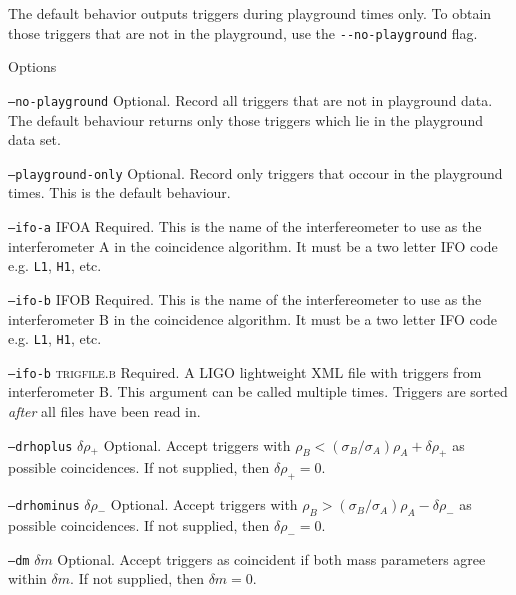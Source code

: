 \begin{entry}
The default behavior outputs triggers during playground times only. To obtain
those triggers that are not in the playground, use the \verb$--no-playground$
flag.     

\item[Options]\leavevmode
\begin{entry}
\item[\texttt{--no-playground}] Optional.  Record all triggers that are
not in playground data.  The default behaviour returns only those triggers
which lie in the playground data set.  

\item[\texttt{--playground-only}] Optional.  Record only triggers that
occour in the playground times.  This is the default behaviour.

\item[\texttt{--ifo-a} \textsc{IFOA}] Required. This is the name of the
interfereometer to use as the interferometer A in the coincidence algorithm.
It must be a two letter IFO code e.g. \texttt{L1}, \texttt{H1}, etc.

\item[\texttt{--ifo-b} \textsc{IFOB}] Required. This is the name of the
interfereometer to use as the interferometer B in the coincidence algorithm.
It must be a two letter IFO code e.g. \texttt{L1}, \texttt{H1}, etc.

\item[\texttt{--ifo-b} \textsc{trigfile.b}] Required.  A LIGO lightweight
XML file with triggers from interferometer B.  This argument can be
called multiple times.  Triggers are sorted \emph{after} all files
have been read in. 

\item[\texttt{--drhoplus} \textsc{$\delta\rho_+$}] Optional. Accept triggers
with $\rho_B < (\sigma_B/\sigma_A) \rho_A + \delta\rho_+$ as possible
coincidences.  If not supplied,  then $\delta\rho_+ = 0$.

\item[\texttt{--drhominus} \textsc{$\delta\rho_-$}] Optional. Accept triggers
with $\rho_B > (\sigma_B/\sigma_A) \rho_A - \delta\rho_-$ as possible
coincidences.  If not supplied,  then $\delta\rho_- = 0$.

\item[\texttt{--dm} \textsc{$\delta m$}] Optional. Accept triggers as
coincident if both mass parameters agree within $\delta m$.  If not
supplied,  then $\delta m = 0$.


\end{entry}
\end{entry}
